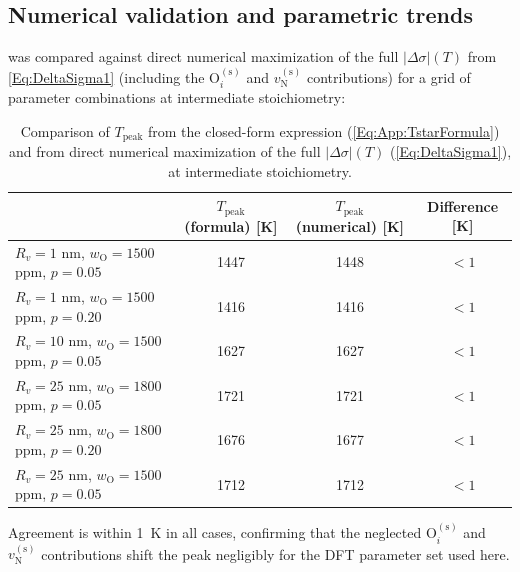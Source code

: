 \documentclass[preprint,12pt,sort&compress]{elsarticle}
\newcommand{\?}{\stackrel{?}{=}}
\begin{document}
\subsection{Numerical validation and parametric trends}
\label{App:Tpeak:Validation}

 was compared against direct numerical maximization of the full $|\Delta \sigma|(T)$ from \cref{Eq:DeltaSigma1} (including the $\text{O}_i^{(\text{s})}$ and $v_\text{N}^{(\text{s})}$ contributions) for a grid of parameter combinations at intermediate stoichiometry:

\begin{table}[h!]
\centering
\footnotesize
\caption{Comparison of $T_\text{peak}$ from the closed-form expression (\cref{Eq:App:TstarFormula}) and from direct numerical maximization of the full $|\Delta \sigma|(T)$ (\cref{Eq:DeltaSigma1}), at intermediate stoichiometry.}
\label{Tab:App:Tpeak}
\begin{tabular}{lccc}
\hline
 & $T_\text{peak}$ (formula) [K] & $T_\text{peak}$ (numerical) [K] & Difference [K] \\
\hline
$R_v = 1$ nm,  $w_\text{O} = 1500$ ppm, $p = 0.05$ & 1447 & 1448 & $<1$ \\
$R_v = 1$ nm,  $w_\text{O} = 1500$ ppm, $p = 0.20$ & 1416 & 1416 & $<1$ \\
$R_v = 10$ nm, $w_\text{O} = 1500$ ppm, $p = 0.05$ & 1627 & 1627 & $<1$ \\
$R_v = 25$ nm, $w_\text{O} = 1800$ ppm, $p = 0.05$ & 1721 & 1721 & $<1$ \\
$R_v = 25$ nm, $w_\text{O} = 1800$ ppm, $p = 0.20$ & 1676 & 1677 & $<1$ \\
$R_v = 25$ nm, $w_\text{O} = 1500$ ppm, $p = 0.05$ & 1712 & 1712 & $<1$ \\
\hline
\end{tabular}
\end{table}

Agreement is within 1~K in all cases, confirming that the neglected $\text{O}_i^{(\text{s})}$ and $v_\text{N}^{(\text{s})}$ contributions shift the peak negligibly for the DFT parameter set used here.
\end{document}
